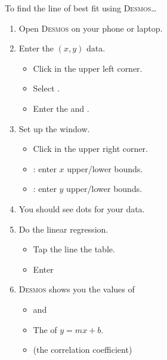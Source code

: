 \small
\begin{minipage}[t]{0.5\textwidth}
\begin{myConcept}{To find the line of best fit using {\scshape Desmos}\dots}
    \begin{enumerate}
        \item Open {\scshape Desmos} on your phone or laptop.
        \item Enter the $(x,y)$ data.
            \begin{itemize}
                \item Click 
                    in the upper left corner.
                \item Select .
                \item Enter the  and .
            \end{itemize}
        \item Set up the window.
            \begin{itemize}
                \item Click 
                    in the upper right corner.
                \item {}: enter $x$ upper/lower bounds.
                \item {}: enter $y$ upper/lower bounds.
            \end{itemize}
        \item You should see dots for your data.
        \item Do the linear regression.
            \begin{itemize}
                \item Tap the line  the table.
                \item Enter 
            \end{itemize}
        \item {\scshape Desmos} shows you the values of
            \begin{itemize}
                \item {} and  %
                \item The  of $y=mx+b$.
                \item {} (the correlation coefficient)
            \end{itemize}
    \end{enumerate}
\end{myConcept}
\end{minipage}
